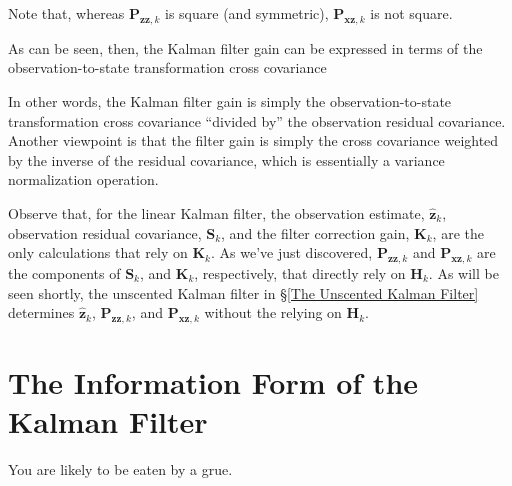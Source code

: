 \documentclass[12pt]{article}
\begin{document}

Note that, whereas $\mathbf{P}_{\mathbf{zz},k}$ is square (and symmetric),
$\mathbf{P}_{\mathbf{xz},k}$ is not square.

As can be seen, then, the Kalman filter gain can be expressed in terms of the
observation-to-state transformation cross covariance


In other words, the Kalman filter gain is simply the observation-to-state transformation
cross covariance “divided by” the observation residual covariance. Another viewpoint is
that the filter gain is simply the cross covariance weighted by the inverse of the residual
covariance, which is essentially a variance normalization operation.

Observe that, for the linear Kalman filter, the observation estimate, $\hat{\mathbf{z}}_k$,
observation residual covariance, $\mathbf{S}_k$, and the filter correction gain, $\mathbf{K}_k$,
are the only calculations that rely on $\mathbf{K}_k$. As we’ve just discovered,
$\mathbf{P}_{\mathbf{zz},k}$ and $\mathbf{P}_{\mathbf{xz},k}$ are the components of $\mathbf{S}_k$,
and $\mathbf{K}_k$, respectively, that directly rely on $\mathbf{H}_k$. As will be seen shortly,
the unscented Kalman filter in \S\ref{The Unscented Kalman Filter} determines
$\hat{\mathbf{z}}_k$, $\mathbf{P}_{\mathbf{zz},k}$, and $\mathbf{P}_{\mathbf{xz},k}$
without the relying on $\mathbf{H}_k$.

\clearpage



\section{The Information Form of the Kalman Filter}

You are likely to be eaten by a grue.
\end{document}

